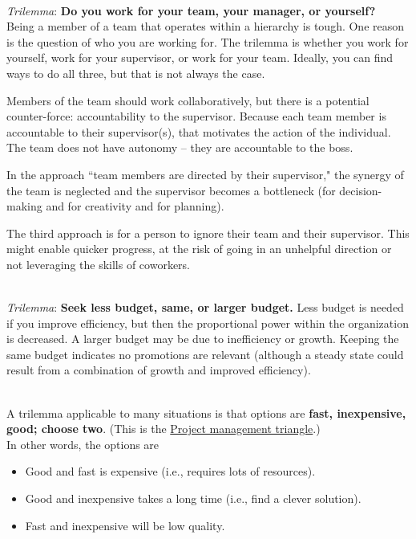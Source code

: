 \ \\

\textit{Trilemma}: \textbf{Do you work for your team, your manager, or yourself?} \\
Being a member of a team that operates within a hierarchy is tough. One reason is the question of who you are working for. The trilemma is whether you work for yourself, work for your supervisor, or work for your team.  Ideally, you can find ways to do all three, but that is not always the case. 

Members of the team should work collaboratively, but there is a potential counter-force: accountability to the supervisor. Because each team member is accountable to their supervisor(s), that motivates the action of the individual. The team does not have autonomy -- they are accountable to the boss.

In the approach ``team members are directed by their supervisor," the synergy of the team is neglected and the supervisor becomes a bottleneck (for decision-making and for creativity and for planning).

The third approach is for a person to ignore their team and their supervisor. This might enable quicker progress, at the risk of going in an unhelpful direction or not leveraging the skills of coworkers. 

\ \\

\textit{Trilemma}:
\textbf{Seek less budget, same, or larger budget.} 
Less budget is needed if you improve efficiency, but then the proportional power within the organization is decreased. A larger budget may be due to inefficiency or growth. Keeping the same budget indicates no promotions are relevant (although a steady state could result from a combination of growth and improved efficiency). 

\ \\

A trilemma applicable to many situations is that options are \textbf{fast, inexpensive, good; choose two}. 
(This is the \href{https://en.wikipedia.org/wiki/Project_management_triangle}{Project management triangle}.) 
\\
In other words, the options are
\begin{itemize}
    \item Good and fast is expensive (i.e., requires lots of resources).
    \item Good and inexpensive takes a long time (i.e., find a clever solution).
    \item Fast and inexpensive will be low quality.
\end{itemize}

